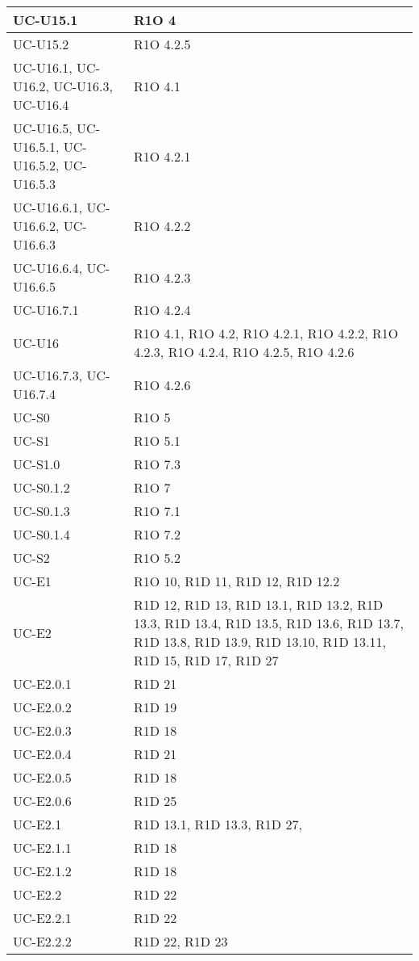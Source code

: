 \begin{center}
\begin{longtable}{ |  p{5cm} | p{5cm} |}
    UC-U15.1 & R1O 4  \\ \hline
    UC-U15.2 & R1O 4.2.5  \\ \hline
    UC-U16.1, UC-U16.2, UC-U16.3, UC-U16.4 & R1O 4.1  \\ \hline
    UC-U16.5, UC-U16.5.1, UC-U16.5.2, UC-U16.5.3 & R1O 4.2.1  \\ \hline
    UC-U16.6.1, UC-U16.6.2, UC-U16.6.3 & R1O 4.2.2  \\ \hline
    UC-U16.6.4, UC-U16.6.5 & R1O 4.2.3  \\ \hline
    UC-U16.7.1 & R1O 4.2.4  \\ \hline
    UC-U16 & R1O 4.1, R1O 4.2, R1O 4.2.1, R1O 4.2.2, R1O 4.2.3, R1O 4.2.4, R1O 4.2.5, R1O 4.2.6   \\ \hline
    UC-U16.7.3, UC-U16.7.4 & R1O 4.2.6  \\ \hline
    UC-S0 & R1O 5  \\ \hline
    UC-S1 & R1O 5.1  \\ \hline
    UC-S1.0 & R1O 7.3  \\ \hline
    UC-S0.1.2 & R1O 7  \\ \hline
    UC-S0.1.3 & R1O 7.1  \\ \hline
    UC-S0.1.4 & R1O 7.2  \\ \hline
    UC-S2 & R1O 5.2  \\ \hline
    UC-E1 & R1O 10, R1D 11, R1D 12, R1D 12.2  \\ \hline
    UC-E2 & R1D 12, R1D 13, R1D 13.1, R1D 13.2, R1D 13.3, R1D 13.4, R1D 13.5, R1D 13.6, R1D 13.7, R1D 13.8, R1D 13.9, R1D 13.10, R1D 13.11, R1D 15, R1D 17, R1D 27  \\ \hline
    UC-E2.0.1 & R1D 21 \\ \hline
    UC-E2.0.2 & R1D 19  \\ \hline
    UC-E2.0.3 & R1D 18  \\ \hline
    UC-E2.0.4 & R1D 21  \\ \hline
    UC-E2.0.5 & R1D 18  \\ \hline
    UC-E2.0.6 & R1D 25  \\ \hline
    UC-E2.1 & R1D 13.1, R1D 13.3, R1D 27,   \\ \hline
    UC-E2.1.1 & R1D 18  \\ \hline
    UC-E2.1.2 & R1D 18  \\ \hline
    UC-E2.2 & R1D 22  \\ \hline
    UC-E2.2.1 & R1D 22 \\ \hline
    UC-E2.2.2 & R1D 22, R1D 23 \\ \hline

\end{longtable}
\end{center}
